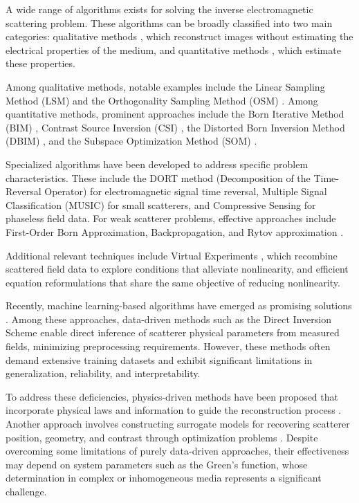 \documentclass{IEEEtran}
\begin{document}
        A wide range of algorithms exists for solving the inverse electromagnetic scattering problem. These algorithms can be broadly classified into two main categories: qualitative methods \cite{pastorino2010ch5}, which reconstruct images without estimating the electrical properties of the medium, and quantitative methods \cite{pastorino2010ch7}, which estimate these properties. 

        Among qualitative methods, notable examples include the Linear Sampling Method (LSM) \cite{chen2017lsm} and the Orthogonality Sampling Method (OSM) \cite{harris2020orthogonality}. Among quantitative methods, prominent approaches include the Born Iterative Method (BIM) \cite{wang1989iterative}, Contrast Source Inversion (CSI) \cite{berg1997contrast}, the Distorted Born Inversion Method (DBIM) \cite{chew1990reconstruction}, and the Subspace Optimization Method (SOM) \cite{chen2010subspace}.

        Specialized algorithms have been developed to address specific problem characteristics. These include the DORT method (Decomposition of the Time-Reversal Operator) \cite{chen2018computational} for electromagnetic signal time reversal, Multiple Signal Classification (MUSIC) \cite{zhong2007music} for small scatterers, and Compressive Sensing \cite{massa2015compressive} for phaseless field data. For weak scatterer problems, effective approaches include First-Order Born Approximation, Backpropagation, and Rytov approximation \cite{chen2018computational}. 

        Additional relevant techniques include Virtual Experiments \cite{isernia2024some,bevacqua2021simple}, which recombine scattered field data to explore conditions that alleviate nonlinearity, and efficient equation reformulations \cite{isernia2024some,bevacqua2021effective} that share the same objective of reducing nonlinearity.

        Recently, machine learning-based algorithms have emerged as promising solutions \cite{chen2020review}. Among these approaches, data-driven methods such as the Direct Inversion Scheme \cite{yao2020enhanced,wei2019solving} enable direct inference of scatterer physical parameters from measured fields, minimizing preprocessing requirements. However, these methods often demand extensive training datasets and exhibit significant limitations in generalization, reliability, and interpretability. 

        To address these deficiencies, physics-driven methods have been proposed that incorporate physical laws and information to guide the reconstruction process \cite{wei2019physics,wang2023push,hu2023more,liu2025exploring}. Another approach involves constructing surrogate models for recovering scatterer position, geometry, and contrast through optimization problems \cite{salucci2022learned,zardi2025physics}. Despite overcoming some limitations of purely data-driven approaches, their effectiveness may depend on system parameters such as the Green's function, whose determination in complex or inhomogeneous media represents a significant challenge.
\end{document}
